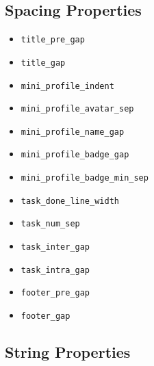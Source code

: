 \documentclass[a4paper, 10pt]{report}
\begin{document}
\subsection{Spacing Properties}
\begin{itemize}
  \item \texttt{title\_pre\_gap}
  \item \texttt{title\_gap}
  \item \texttt{mini\_profile\_indent}
  \item \texttt{mini\_profile\_avatar\_sep}
  \item \texttt{mini\_profile\_name\_gap}
  \item \texttt{mini\_profile\_badge\_gap}
  \item \texttt{mini\_profile\_badge\_min\_sep}
  \item \texttt{task\_done\_line\_width}
  \item \texttt{task\_num\_sep}
  \item \texttt{task\_inter\_gap}
  \item \texttt{task\_intra\_gap}
  \item \texttt{footer\_pre\_gap}
  \item \texttt{footer\_gap}
\end{itemize}
\subsection{String Properties}
\end{document}
